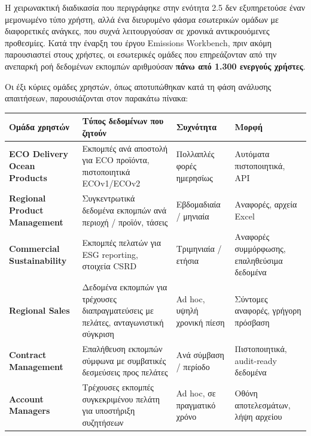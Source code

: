 Η χειρωνακτική διαδικασία που περιγράφηκε στην ενότητα 2.5 δεν
εξυπηρετούσε έναν μεμονωμένο τύπο χρήστη, αλλά ένα διευρυμένο φάσμα
εσωτερικών ομάδων με διαφορετικές ανάγκες, που συχνά λειτουργούσαν σε
χρονικά αντικρουόμενες προθεσμίες. Κατά την έναρξη του έργου Emissions
Workbench, πριν ακόμη παρουσιαστεί στους χρήστες, οι εσωτερικές ομάδες
που επηρεάζονταν από την ανεπαρκή ροή δεδομένων εκπομπών αριθμούσαν
\textbf{πάνω από 1.300 ενεργούς χρήστες}.

Οι έξι κύριες ομάδες χρηστών, όπως αποτυπώθηκαν κατά τη φάση ανάλυσης
απαιτήσεων, παρουσιάζονται στον παρακάτω πίνακα:

{\def\LTcaptype{} %
\begin{longtable}[]{@{}
  >{\raggedright\arraybackslash}p{}
  >{\raggedright\arraybackslash}p{}
  >{\raggedright\arraybackslash}p{}
  >{\raggedright\arraybackslash}p{}@{}}
\toprule\noalign{}
\begin{minipage}[b]{\linewidth}\raggedright
Ομάδα χρηστών
\end{minipage} & \begin{minipage}[b]{\linewidth}\raggedright
Τύπος δεδομένων που ζητούν
\end{minipage} & \begin{minipage}[b]{\linewidth}\raggedright
Συχνότητα
\end{minipage} & \begin{minipage}[b]{\linewidth}\raggedright
Μορφή
\end{minipage} \\
\midrule\noalign{}
\endhead
\bottomrule\noalign{}
\endlastfoot
\textbf{ECO Delivery Ocean Products} & Εκπομπές ανά αποστολή για ECO
προϊόντα, πιστοποιητικά ECOv1/ECOv2 & Πολλαπλές φορές ημερησίως &
Αυτόματα πιστοποιητικά, API \\
\textbf{Regional Product Management} & Συγκεντρωτικά δεδομένα εκπομπών
ανά περιοχή / προϊόν, τάσεις & Εβδομαδιαία / μηνιαία & Αναφορές, αρχεία
Excel \\
\textbf{Commercial Sustainability} & Εκπομπές πελατών για ESG reporting,
στοιχεία CSRD & Τριμηνιαία / ετήσια & Αναφορές συμμόρφωσης, επαληθεύσιμα
δεδομένα \\
\textbf{Regional Sales} & Δεδομένα εκπομπών για τρέχουσες
διαπραγματεύσεις με πελάτες, ανταγωνιστική σύγκριση & Ad hoc, υψηλή
χρονική πίεση & Σύντομες αναφορές, γρήγορη πρόσβαση \\
\textbf{Contract Management} & Επαλήθευση εκπομπών σύμφωνα με συμβατικές
δεσμεύσεις προς πελάτες & Ανά σύμβαση / περίοδο & Πιστοποιητικά,
audit-ready δεδομένα \\
\textbf{Account Managers} & Τρέχουσες εκπομπές συγκεκριμένου πελάτη για
υποστήριξη συζητήσεων & Ad hoc, σε πραγματικό χρόνο & Οθόνη
αποτελεσμάτων, λήψη αρχείου \\
\end{longtable}
}

